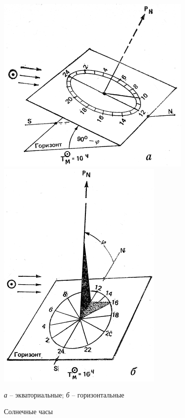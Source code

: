 \documentclass[a4paper, 12pt, twoside, final, book, russian, fittopage, cyremdash]{ncc}
\begin{document}
\begin{figure}[htb]
  \begin{minipage}[b]{0.49\textwidth}
    \centering
    \includegraphics[scale=1.2]{0092-1P}
  \end{minipage}
  \hfil\hfil
  \begin{minipage}[b]{0.49\textwidth}
    \centering
    \includegraphics[scale=1.2]{0092-2P}
  \end{minipage}
    \caption{Солнечные часы}
    \label{fig:113}
    \small
    \centering{}
    \textit{а} \--- экваториальные; \textit{б} \--- горизонтальные
\end{figure}
\end{document}
